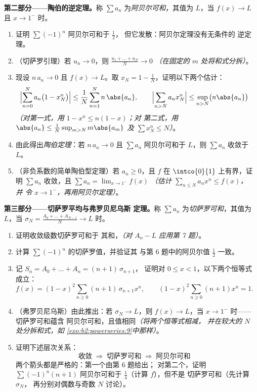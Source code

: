 \begin{problem}
\medskip
\noindent\textbf{第二部分——陶伯的逆定理。}称 $\sum
a_n$ 为\emph{阿贝尔可和}，其值为 $L$，当 $f(x) \to L$ 且 $x \to
1^-$ 时。
\begin{enumerate}[resume]
  \item 证明 $\sum (-1)^n$ 阿贝尔可和于 $\frac12$，
        但它发散：阿贝尔定理没有无条件的
        逆定理。
  \item （切萨罗引理）若 $u_n \to 0$，则 $\frac{u_1 + \dots
        + u_N}{N} \to 0$ \emph{（在固定的 $m$ 处将和式分拆）}。
  \item 现设 $n\,a_n \to 0$ 且 $f(x) \to L$。取 $x_N =
        1 - \frac1N$，证明以下两个估计：
        \[
        \Bigl|\sum_{n=0}^{N} a_n\bigl(1 - x_N^n\bigr)\Bigr|
        \leq \frac{1}{N}\sum_{n=1}^{N} n\,\abs{a_n},
        \qquad
        \Bigl|\sum_{n>N} a_n x_N^n\Bigr|
        \leq \sup_{n>N}\bigl(n\abs{a_n}\bigr)
        \]
        \emph{（对第一式，用 $1 - x^n \leq n(1-x)$；对
        第二式，用 $\abs{a_n} \leq \frac{1}{N}\sup_{m>N}
        m\abs{a_m}$ 及 $\sum x_N^n \leq N$）}。
  \item 由此得出\emph{陶伯定理}：若 $n\,a_n \to 0$ 且
        $\sum a_n$ 阿贝尔可和于 $L$，则 $\sum a_n$
        收敛于 $L$。
  \item （非负系数的简单陶伯型定理）若 $a_n
        \geq 0$，且 $f$ 在 $\intco{0}{1}$ 上有界，证明
        $\sum a_n$ 收敛，且 $\sum a_n = \lim_{x\to1^-}
        f(x)$ \emph{（估计 $\sum_{n\leq N}a_nx^n \leq f(x)$，并
        令 $x \to 1^-$，再用阿贝尔定理）}。
\end{enumerate}

\medskip
\noindent\textbf{第三部分——切萨罗平均与弗罗贝尼乌斯
定理。}称 $\sum a_n$ 为\emph{切萨罗可和}，其值为 $L$，当
$\sigma_N = \frac{A_0 + \dots + A_{N-1}}{N} \to L$ 时。
\begin{enumerate}[resume]
  \item 证明收敛级数切萨罗可和于
        其和，\emph{（对 $A_n - L$ 应用第 7 题）}。
  \item 计算 $\sum(-1)^n$ 的切萨罗值，并验证其
        与第 6 题中的阿贝尔值 $\frac12$ 一致。
  \item 记 $S_n = A_0 + \dots + A_n = (n+1)\,\sigma_{n+1}$，
        证明对 $0 \leq x < 1$，以下两个恒等式成立：
        \[
        f(x) = (1-x)^2\sum_{n\geq0}(n+1)\,\sigma_{n+1}x^n,
        \qquad
        (1-x)^2\sum_{n\geq0}(n+1)x^n = 1 .
        \]
  \item （弗罗贝尼乌斯）由此推出：若 $\sigma_N \to L$，则 $f(x) \to
        L$，当 $x \to 1^-$ 时——切萨罗可和蕴含
        阿贝尔可和，且值相同\emph{（将两个恒等式相减，
        并在较大的 $N$ 处分拆和式，如
        \cref{exo:b2:powerseries:9}中那样）}。
  \item 证明下述层次关系：
        \[
        \text{收敛} \;\Longrightarrow\;
        \text{切萨罗可和} \;\Longrightarrow\;
        \text{阿贝尔可和}
        \]
        两个箭头都是严格的：第一个由第 6 题给出；
        对第二个，证明 $\sum(-1)^n(n+1)$
        阿贝尔可和于 $\frac14$（计算 $f$），但不是
        切萨罗可和（先计算 $\sigma_N$，
        再分别对偶数与奇数 $N$ 讨论）。
\end{enumerate}


\end{problem}

